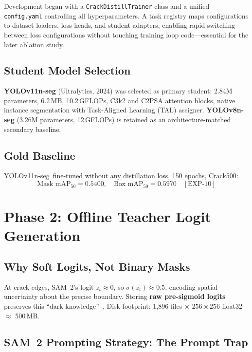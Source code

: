 \documentclass[12pt,a4paper]{article}
\newcommand{\yolo}{YOLOv11n-seg}
\begin{document}
Development began with a \texttt{CrackDistillTrainer} class and a unified
\texttt{config.yaml} controlling all hyperparameters.
A task registry maps configurations to dataset loaders, loss heads, and student
adapters, enabling rapid switching between loss configurations without touching
training loop code---essential for the later ablation study.

\subsection{Student Model Selection}

\textbf{YOLOv11n-seg} (Ultralytics, 2024) was selected as primary student:
2.84M parameters, 6.2\,MB, 10.2\,GFLOPs, C3k2 and C2PSA attention blocks,
native instance segmentation with Task-Aligned Learning (TAL) assigner.
\textbf{YOLOv8n-seg} (3.26M parameters, 12\,GFLOPs) is retained as an
architecture-matched secondary baseline.

\subsection{Gold Baseline}

\yolo\ fine-tuned without any distillation loss, 150 epochs, Crack500:
\[
\text{Mask mAP}_{50} = \mathbf{0.5400},\quad
\text{Box mAP}_{50} = \mathbf{0.5970}
\quad [\text{EXP-10}]
\]

\section{Phase 2: Offline Teacher Logit Generation}
\label{sec:phase2}

\subsection{Why Soft Logits, Not Binary Masks}

At crack edges, SAM~2's logit $z_t \approx 0$, so $\sigma(z_t)\approx 0.5$,
encoding spatial uncertainty about the precise boundary.
Storing \textbf{raw pre-sigmoid logits} preserves this ``dark
knowledge''~\cite{hinton2015distilling}.
Disk footprint: 1,896 files $\times$ $256\times256$ float32 $\approx$ 500\,MB.

\subsection{SAM~2 Prompting Strategy: The Prompt Trap}
\label{sec:prompttrap}
\end{document}
